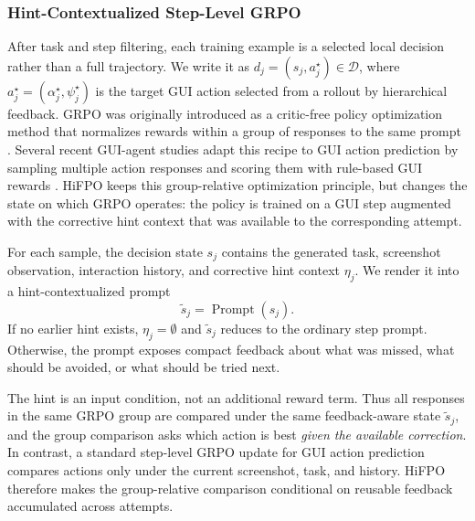 \documentclass{llmxive}
\providecommand{\hifpo}{HiFPO\xspace}
\begin{document}
\subsubsection{Hint-Contextualized Step-Level GRPO}

After task and step filtering, each training example is a selected local decision rather than a full trajectory. We write it as $d_j=(s_j,a_j^\star)\in\mathcal{D}$, where $a_j^\star=(\alpha_j^\star,\psi_j^\star)$ is the target GUI action selected from a rollout by hierarchical feedback. GRPO was originally introduced as a critic-free policy optimization method that normalizes rewards within a group of responses to the same prompt \citep{shao2024deepseekmath}. Several recent GUI-agent studies adapt this recipe to GUI action prediction by sampling multiple action responses and scoring them with rule-based GUI rewards \citep{lu2025ui,shi2025mobilegui}. \hifpo keeps this group-relative optimization principle, but changes the state on which GRPO operates: the policy is trained on a GUI step augmented with the corrective hint context that was available to the corresponding attempt.

For each sample, the decision state $s_j$ contains the generated task, screenshot observation, interaction history, and corrective hint context $\eta_j$. We render it into a hint-contextualized prompt
\begin{equation}
\label{eq:hint-prompt}
    \tilde{s}_j
    =\operatorname{Prompt}(s_j).
\end{equation}
If no earlier hint exists, $\eta_j=\emptyset$ and $\tilde{s}_j$ reduces to the ordinary step prompt. Otherwise, the prompt exposes compact feedback about what was missed, what should be avoided, or what should be tried next.

The hint is an input condition, not an additional reward term. Thus all responses in the same GRPO group are compared under the same feedback-aware state $\tilde{s}_j$, and the group comparison asks which action is best \emph{given the available correction}. In contrast, a standard step-level GRPO update for GUI action prediction compares actions only under the current screenshot, task, and history. \hifpo therefore makes the group-relative comparison conditional on reusable feedback accumulated across attempts.
\end{document}
